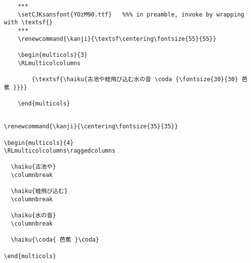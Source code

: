\documentclass[letterpaper]{article}
\begin{document}
	
		\vspace*{2cm}
	
	\renewcommand{\kanji}{\centering\fontsize{55}{55}}
	\begin{multicols}{3}
		
		\RLmulticolcolumns
		
		{\textsf{}}
		
	\end{multicols}
	
	\vspace*{1cm}
	
	\begin{verbatim}
	***
	\setCJKsansfont{YOzM90.ttf}   %%% in preamble, invoke by wrapping with \textsf{}
	***
	\renewcommand{\kanji}{\textsf\centering\fontsize{55}{55}}
	
	\begin{multicols}{3}
	\RLmulticolcolumns
	
	   	{\textsf{\haiku{古池や蛙飛び込む水の音 \coda {\fontsize{30}{30} 芭蕉 }}}}
	
	\end{multicols}
	
	\end{verbatim}
	
	\pagebreak
	
	\vspace*{2cm}
			
	\renewcommand{\kanji}{\centering\fontsize{35}{35}}
	\begin{multicols}{4}
		\RLmulticolcolumns\raggedcolumns
		
		\columnbreak
		\columnbreak
		\columnbreak
			
	\end{multicols}

\vspace*{1cm}

\begin{verbatim}
\renewcommand{\kanji}{\centering\fontsize{35}{35}}

\begin{multicols}{4}
\RLmulticolcolumns\raggedcolumns

  \haiku{古池や}
  \columnbreak

  \haiku{蛙飛び込む}
  \columnbreak

  \haiku{水の音}
  \columnbreak

  \haiku{\coda{ 芭蕉 }\coda}

\end{multicols}

\end{verbatim}
	
\end{document}

